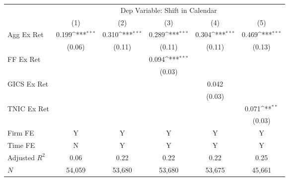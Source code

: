          {         \def\sym#1{\ifmmode^{#1}\else\(^{#1}\)\fi}         \begin{tabular}{l*{5}{c}}         \toprule          &\multicolumn{5}{c}{Dep Variable: Shift in Calendar} \\         \cmidrule(lr){2-6}           &\multicolumn{1}{c}{(1)}&\multicolumn{1}{c}{(2)} &\multicolumn{1}{c}{(3)}         &\multicolumn{1}{c}{(4)}        &\multicolumn{1}{c}{(5)} \\         
\midrule
Agg Ex Ret  &       0.199\sym{***}&       0.310\sym{***}&       0.289\sym{***}&       0.304\sym{***}&       0.469\sym{***}\\
            &      (0.06)         &      (0.11)         &      (0.11)         &      (0.11)         &      (0.13)         \\
FF Ex Ret   &                     &                     &       0.094\sym{***}&                     &                     \\
            &                     &                     &      (0.03)         &                     &                     \\
GICS Ex Ret &                     &                     &                     &       0.042         &                     \\
            &                     &                     &                     &      (0.03)         &                     \\
TNIC Ex Ret &                     &                     &                     &                     &       0.071\sym{**} \\
            &                     &                     &                     &                     &      (0.03)         \\
         \cmidrule(lr){1-6}          \multicolumn{1}{l}{Firm FE} & Y&Y&Y&Y&Y \\         \multicolumn{1}{l}{Time FE} & N&Y&Y&Y&Y \\         
Adjusted $R^2$&        0.06         &        0.22         &        0.22         &        0.22         &        0.25         \\
$N$         &      54,059         &      53,680         &      53,680         &      53,675         &      45,661         \\
\bottomrule                         \end{tabular}                         }

